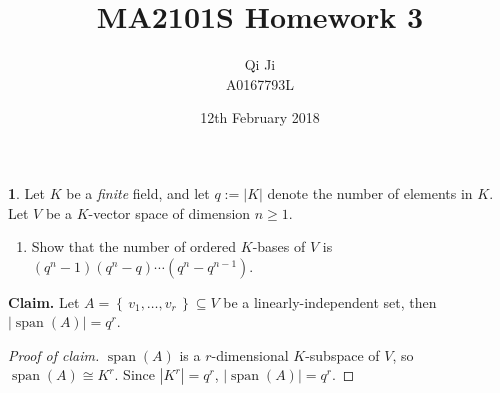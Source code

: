\documentclass{article}
\author{Qi Ji\\\small A0167793L}
\title{MA2101S Homework 3}
\date{12th February 2018}
\theoremstyle{definition}
\newtheorem{problem}{}
\numberwithin{lemma}{problem}
\numberwithin{equation}{problem}
\newcommand{\set}[1]{\left\{\,#1\,\right\}}
\DeclareMathOperator{\spn}{span}
\renewcommand{\geq}{\geqslant}
\begin{document}
\maketitle

\begin{problem}
    Let $K$ be a \emph{finite} field, and let $q:=|K|$ denote the number of elements in $K$.
    Let $V$ be a $K$-vector space of dimension $n\geq 1$.
\end{problem}
\begin{enumerate}[label=(\alph*)]
    \item Show that the number of ordered $K$-bases of $V$ is
        $(q^n-1)(q^n-q)\cdots(q^n-q^{n-1})$.
\end{enumerate}
\textbf{Claim.} Let $A=\set{v_1,\dots,v_r}\subseteq V$ be a linearly-independent set,
    then $|\spn(A)| = q^r$.
\begin{proof}[Proof of claim]
    $\spn(A)$ is a $r$-dimensional $K$-subspace of $V$,
    so $\spn(A) \cong K^r$.
    Since $|K^r| = q^r$, $|\spn(A)| = q^r$.
\end{proof}
\end{document}
